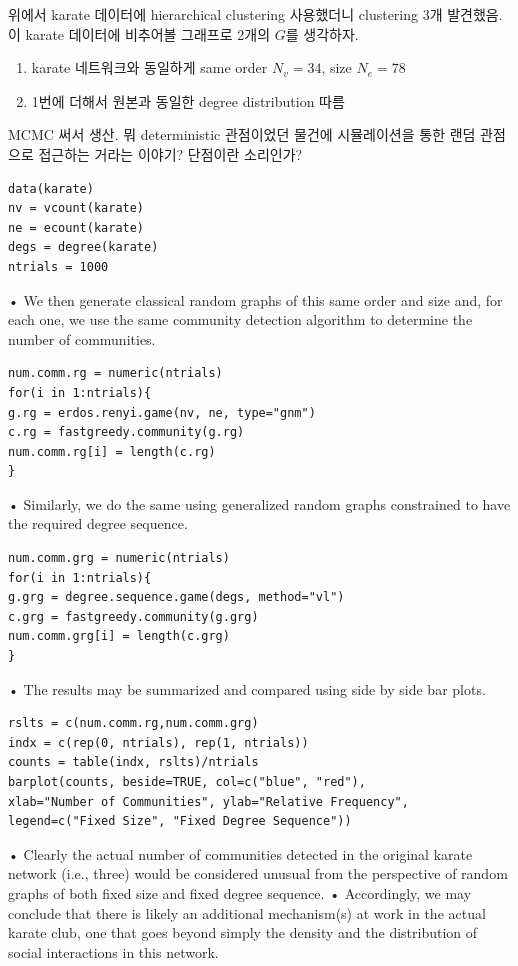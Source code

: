 \documentclass[
]{book}
\providecommand{\tightlist}{%
  \setlength{\itemsep}{0pt}\setlength{\parskip}{0pt}}
\begin{document}
{{{위에서 karate 데이터에 hierarchical clustering 사용했더니 clustering 3개 발견했음. 이 karate 데이터에 비추어볼 그래프로 2개의 \(G\)를 생각하자.

\begin{enumerate}
\def\labelenumi{\arabic{enumi}.}
\tightlist
\item
  karate 네트워크와 동일하게 same order \(N_v = 34\), size \(N_e = 78\)
\item
  1번에 더해서 원본과 동일한 degree distribution 따름
\end{enumerate}

MCMC 써서 생산. 뭐 deterministic 관점이었던 물건에 시뮬레이션을 통한 랜덤 관점으로 접근하는 거라는 이야기? 단점이란 소리인가?

\begin{verbatim}
data(karate)
nv = vcount(karate)
ne = ecount(karate)
degs = degree(karate)
ntrials = 1000
\end{verbatim}

• We then generate classical random graphs of this same order and size and, for each one, we use the
same community detection algorithm to determine the number of communities.

\begin{verbatim}
num.comm.rg = numeric(ntrials)
for(i in 1:ntrials){
g.rg = erdos.renyi.game(nv, ne, type="gnm")
c.rg = fastgreedy.community(g.rg)
num.comm.rg[i] = length(c.rg)
}
\end{verbatim}

• Similarly, we do the same using generalized random graphs constrained to have the required degree
sequence.

\begin{verbatim}
num.comm.grg = numeric(ntrials)
for(i in 1:ntrials){
g.grg = degree.sequence.game(degs, method="vl")
c.grg = fastgreedy.community(g.grg)
num.comm.grg[i] = length(c.grg)
}
\end{verbatim}

• The results may be summarized and compared using side by side bar plots.

\begin{verbatim}
rslts = c(num.comm.rg,num.comm.grg)
indx = c(rep(0, ntrials), rep(1, ntrials))
counts = table(indx, rslts)/ntrials
barplot(counts, beside=TRUE, col=c("blue", "red"),
xlab="Number of Communities", ylab="Relative Frequency",
legend=c("Fixed Size", "Fixed Degree Sequence"))
\end{verbatim}

• Clearly the actual number of communities detected in the original karate network (i.e., three) would
be considered unusual from the perspective of random graphs of both fixed size and fixed degree
sequence.
• Accordingly, we may conclude that there is likely an additional mechanism(s) at work in the actual
karate club, one that goes beyond simply the density and the distribution of social interactions in
this network.

}}}
\end{document}
